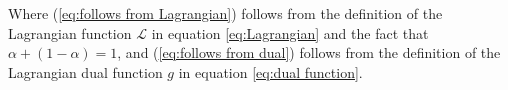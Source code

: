 Where (\ref{eq:follows from Lagrangian}) follows from the definition of the Lagrangian function $\mathcal{L}$ in equation \ref{eq:Lagrangian} and the fact that $\alpha + (1 - \alpha) = 1$, and (\ref{eq:follows from dual}) follows from the definition of the Lagrangian dual function $g$ in equation \ref{eq:dual function}.
